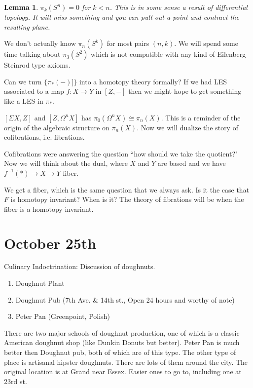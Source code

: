 \documentclass[12pt]{article}
\newtheorem{lemma}[theorem]{Lemma}
\theoremstyle{definition}
\begin{document}
	\begin{lemma}{1}
		$\pi_k(S^n)=0$ for $k<n$. This is in some sense a result of differential topology. It will miss something and you can pull out a point and contract the resulting plane. 
	\end{lemma}
	We don't actually know $\pi_n(S^k)$ for most pairs $(n,k)$. We will spend some time talking about $\pi_3(S^2)$ which is not compatible with any kind of Eilenberg Steinrod type axioms.  
	
	Can we turn $\{\pi_*(-)]\}$ into a homotopy theory formally? If we had LES associated to a map $f:X\to Y$ in $[Z,-]$ then we might hope to get something like a LES in $\pi_*$. 
	
	$[\Sigma X,Z]$ and $[Z,\Omega^n X]$ has $\pi_0(\Omega^n X)\cong \pi_n(X)$. This is a reminder of the origin of the algebraic structure on $\pi_n(X)$. Now we will dualize the story of cofibrations, i.e. fibrations. 
	
	Cofibrations were answering the question ``how should we take the quotient?" Now we will think about the dual, where $X$ and $Y$ are based and we have $f^{-1}(\ast)\to X\to Y$ fiber. 
	\begin{center}
	\end{center}
	We get a fiber, which is the same question that we always ask. Is it the case that $F$ is homotopy invariant?  When is it?  The theory of fibrations will be when the fiber is a homotopy invariant. 
	\begin{center}
	\end{center}
\section{October 25th}

Culinary Indoctrination:
Discussion of doughnuts. 
\begin{enumerate}
	\item Doughnut Plant
	\item Doughnut Pub (7th Ave. \& 14th st., Open 24 hours and worthy of note)
	\item Peter Pan (Greenpoint, Polish)
\end{enumerate}
There are two major schools of doughnut production, one of which is a classic American doughnut shop (like Dunkin Donuts but better). Peter Pan is much better then Doughnut pub, both of which are of this type. The other type of place is artisanal hipster doughnuts. There are lots of them around the city. The original location is at Grand near Essex. Easier ones to go to, including one at 23rd st.
\end{document}

